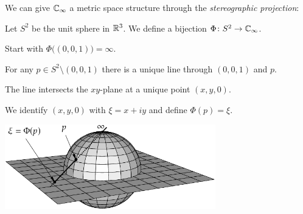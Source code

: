 \documentclass[10pt,aspectratio=169]{beamer}
\begin{document}
\begin{frame}
We can give ${\mathbb{C}}_\infty$ a metric space structure through the
\emph{stereographic projection}:

\medskip
\pause

Let $S^2$ be the unit sphere in ${\mathbb{R}}^3$.  We define
a bijection $\Phi \colon S^2 \to {\mathbb{C}}_{\infty}$.

\medskip
\pause

Start with $\Phi\bigl((0,0,1)\bigr) = \infty$.

\medskip
\pause


For any $p \in S^2 \setminus (0,0,1)$ there is a unique
line through $(0,0,1)$ and $p$.

\medskip
\pause

The line intersects the $xy$-plane at a unique point $(x,y,0)$.

\medskip
\pause

We identify $(x,y,0)$ with $\xi=x+iy$ and define
$\Phi(p) = \xi$.

\medskip
\pause

\begin{center}
\includegraphics[width=3.6in]{../figures/riemannsphere}
\end{center}

\end{frame}
\end{document}
